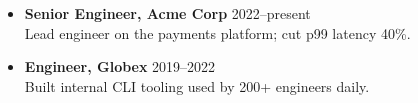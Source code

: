 \begin{itemize}[leftmargin=1.4em,itemsep=2pt,topsep=0pt]
  \item \textbf{Senior Engineer, Acme Corp} \hfill 2022--present\\
    Lead engineer on the payments platform; cut p99 latency 40\%.
  \item \textbf{Engineer, Globex} \hfill 2019--2022\\
    Built internal CLI tooling used by 200+ engineers daily.
\end{itemize}
